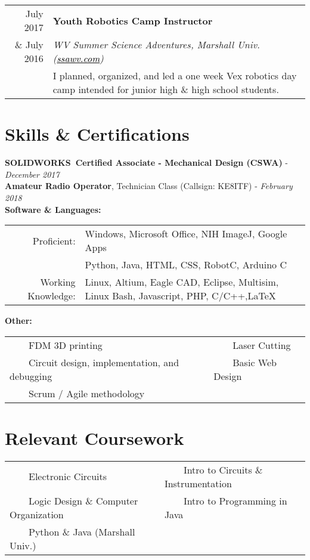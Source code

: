 \documentclass[a4paper,10pt]{article}
\newcommand{\tabitem}{~~\llap{\textbullet}~~}
\begin{document}
\begin{tabular}{r|p{14cm}}
July 2017  			& \textbf{Youth Robotics Camp Instructor}\\
\& July 2016		& \textit{WV Summer Science Adventures, Marshall Univ. (\href{ssawv.com}{\textcolor{black}{ssawv.com}})}\\
				&\footnotesize{I planned, organized, and led a one week Vex robotics day camp intended for junior high \& high school students.}
\end{tabular}


\section{Skills \& Certifications}\vspace{-1mm}

\textbf{SOLIDWORKS\textregistered~Certified Associate - Mechanical Design (CSWA)} - \textit{December 2017}\vspace{2mm}\\
\textbf{Amateur Radio Operator}, Technician Class (Callsign: KE8ITF) - \textit{February 2018}\vspace{2mm}\\
\textbf{\large{Software \& Languages:}}
\vspace{1mm}\\
\begin{tabular}{rl}
Proficient:			& Windows, Microsoft Office, NIH ImageJ, Google Apps\\
					& Python, Java, HTML, CSS, RobotC, Arduino C \\
Working Knowledge:	& Linux, Altium, Eagle CAD, Eclipse, Multisim, Linux Bash, Javascript, PHP, C/C++,{\fb \LaTeX}\\
\end{tabular}

\textbf{\large{Other:}}\vspace{1mm}\\
\begin{tabular}{ll}
\tabitem FDM 3D printing 						& \tabitem Laser Cutting \\
\tabitem Circuit design, implementation, and debugging	& \tabitem Basic Web Design\\
\tabitem Scrum / Agile methodology 				& 
\end{tabular}

\section{Relevant Coursework}\vspace{-1mm}
\begin{tabular}{ll}
\tabitem Electronic Circuits 					& 	\tabitem Intro to Circuits \& Instrumentation	\\
\tabitem Logic Design \& Computer Organization 	&  	\tabitem Intro to Programming in Java \\
\tabitem Python \& Java (Marshall Univ.) 		& 
\end{tabular}
\end{document}
